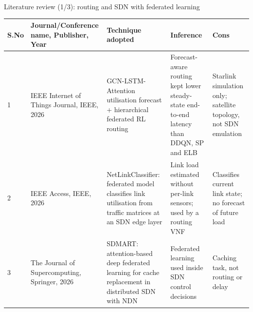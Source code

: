 \documentclass[11pt,aspectratio=169]{beamer}
\begin{document}
\newcommand{\litcols}{\setlength\tabcolsep{3pt}\renewcommand{\arraystretch}{1.15}%
  \begin{tabular}{@{}>{\raggedright}p{0.5cm}>{\raggedright}p{2.9cm}>{\raggedright}p{3.4cm}>{\raggedright}p{3.4cm}>{\raggedright\arraybackslash}p{2.9cm}@{}}}
\newcommand{\lithead}{\toprule \textbf{S.No} & \textbf{Journal/Conference name, Publisher, Year} & \textbf{Technique adopted} & \textbf{Inference} & \textbf{Cons}\tabularnewline \midrule}

\begin{frame}{Literature review (1/3): routing and SDN with federated learning}
  \footnotesize
  \litcols \lithead
  1 & IEEE Internet of Things Journal, IEEE, 2026 \cite{yang2026hfrl} & GCN-LSTM-Attention utilisation forecast + hierarchical federated RL routing & Forecast-aware routing kept lower steady-state end-to-end latency than DDQN, SP and ELB & Starlink simulation only; satellite topology, not SDN emulation\tabularnewline\midrule
  2 & IEEE Access, IEEE, 2026 \cite{silva2026netlink} & NetLinkClassifier: federated model classifies link utilisation from traffic matrices at an SDN edge layer & Link load estimated without per-link sensors; used by a routing VNF & Classifies current link state; no forecast of future load\tabularnewline\midrule
  3 & The Journal of Supercomputing, Springer, 2026 \cite{sadeghi2026sdmart} & SDMART: attention-based deep federated learning for cache replacement in distributed SDN with NDN & Federated learning used inside SDN control decisions & Caching task, not routing or delay\tabularnewline
  \bottomrule\end{tabular}
\end{frame}
\end{document}
